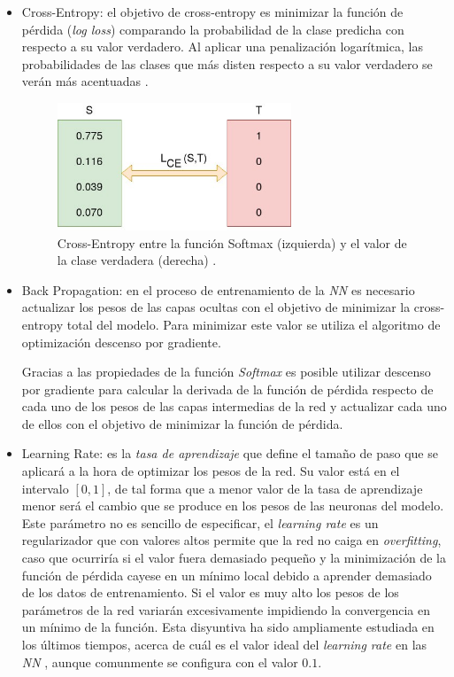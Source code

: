 \begin{itemize}
                \item Cross-Entropy: el objetivo de cross-entropy es minimizar la función de pérdida (\textit{log loss}) comparando la probabilidad de la clase predicha con respecto a su valor verdadero. Al aplicar una penalización logarítmica, las probabilidades de las clases que más disten respecto a su valor verdadero se verán más acentuadas \cite{Cross-Entropy}.

                \begin{figure}[h]
                    \centering
                    \includegraphics[width=7cm]{archivos/3.Tecnologias/RedesNeuronales/CrossEntropy}
                    \captionsetup{width=.65\textwidth}
                    \caption{Cross-Entropy entre la función Softmax (izquierda) y el valor de la clase verdadera (derecha) \cite{Cross-Entropy}.}
                    \label{CrossEntropyImage}
                 \end{figure}

                \item Back Propagation: en el proceso de entrenamiento de la \textit{NN} es necesario actualizar los pesos de las capas ocultas con el objetivo de minimizar la cross-entropy total del modelo. Para minimizar este valor se utiliza el algoritmo de optimización descenso por gradiente.

                Gracias a las propiedades de la función \textit{Softmax} es posible utilizar descenso por gradiente para calcular la derivada de la función de pérdida respecto de cada uno de los pesos de las capas intermedias de la red y actualizar cada uno de ellos con el objetivo de minimizar la función de pérdida.

                \item Learning Rate: es la \textit{tasa de aprendizaje} que define el tamaño de paso que se aplicará a la hora de optimizar los pesos de la red. Su valor está en el intervalo $[0,1]$, de tal forma que a menor valor de la tasa de aprendizaje menor será el cambio que se produce en los pesos de las neuronas del modelo. Este parámetro no es sencillo de especificar, el \textit{learning rate} es un regularizador que con valores altos permite que la red no caiga en \textit{overfitting}, caso que ocurriría si el valor fuera demasiado pequeño y la minimización de la función de pérdida cayese en un mínimo local debido a aprender demasiado de los datos de entrenamiento. Si el valor es muy alto los pesos de los parámetros de la red variarán excesivamente impidiendo la convergencia en un mínimo de la función. Esta disyuntiva ha sido ampliamente estudiada en los últimos tiempos, acerca de cuál es el valor ideal del \textit{learning rate} en las \textit{NN} \cite{LearningRate}, aunque comunmente se configura con el valor $0.1$.


\end{itemize}

